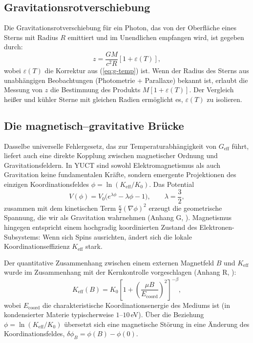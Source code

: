 \documentclass[12pt]{article}
\theoremstyle{remark}
\newcommand{\Keff}{K_{\mathrm{eff}}}
\newcommand{\eps}{\varepsilon}
\begin{document}
	\subsection{Gravitationsrotverschiebung}
	\label{subsec:redshift}
	
	Die Gravitationsrotverschiebung für ein Photon, das von der Oberfläche eines Sterns mit Radius $R$ emittiert und im Unendlichen empfangen wird, ist gegeben durch:
	\begin{equation}
		z = \frac{GM}{c^2 R} \left[ 1 + \eps(T) \right],
		\label{eq:redshift}
	\end{equation}
	wobei $\eps(T)$ die Korrektur aus (\ref{eq:g-temp}) ist. Wenn der Radius des Sterns aus unabhängigen Beobachtungen (Photometrie + Parallaxe) bekannt ist, erlaubt die Messung von $z$ die Bestimmung des Produkts $M[1+\eps(T)]$. Der Vergleich heißer und kühler Sterne mit gleichen Radien ermöglicht es, $\eps(T)$ zu isolieren.
	
	\subsection{Die magnetisch–gravitative Brücke}
	\label{subsec:magnetism-gravity}
	
	Dasselbe universelle Fehlergesetz, das zur Temperaturabhängigkeit von $G_{\mathrm{eff}}$ führt, liefert auch eine direkte Kopplung zwischen magnetischer Ordnung und Gravitationsfeldern.
	In YUCT sind sowohl Elektromagnetismus als auch Gravitation keine fundamentalen Kräfte, sondern emergente Projektionen des einzigen Koordinationsfeldes $\phi = \ln(\Keff/K_0)$. 
	Das Potential
	\begin{equation}
		V(\phi) = V_0\bigl(e^{\lambda\phi} - \lambda\phi - 1\bigr), \qquad \lambda = \frac{3}{2},
	\end{equation}
	zusammen mit dem kinetischen Term $\frac{\kappa}{2}(\nabla\phi)^2$ erzeugt die geometrische Spannung, die wir als Gravitation wahrnehmen (Anhang G, \cite{AppendixG}). 
	Magnetismus hingegen entspricht einem hochgradig koordinierten Zustand des Elektronen-Subsystems: Wenn sich Spins ausrichten, ändert sich die lokale Koordinationseffizienz $\Keff$ stark.
	
	Der quantitative Zusammenhang zwischen einem externen Magnetfeld $B$ und $\Keff$ wurde im Zusammenhang mit der Kernkontrolle vorgeschlagen (Anhang R, \cite{AppendixR}):
	\begin{equation}
		\Keff(B) = K_0 \left[ 1 + \left( \frac{\mu B}{E_{\mathrm{coord}}} \right)^2 \right]^{-\beta},
		\label{eq:keff-B}
	\end{equation}
	wobei $E_{\mathrm{coord}}$ die charakteristische Koordinationsenergie des Mediums ist (in kondensierter Materie typischerweise $1$--$10$\,eV). 
	Über die Beziehung $\phi = \ln(\Keff/K_0)$ übersetzt sich eine magnetische Störung in eine Änderung des Koordinationsfeldes, $\delta\phi_B = \phi(B) - \phi(0)$.
	
\end{document}
